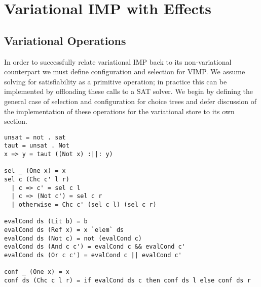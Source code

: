 \documentclass[letterpaper,10pt,onecolumn]{article}
\begin{document}
\section{Variational IMP with Effects}

\subsection{Variational Operations}

In order to successfully relate variational IMP back to its non-variational counterpart
we must define configuration and selection for VIMP. We assume solving for satisfiability
as a primitive operation; in practice this can be implemented by offloading these calls to
a SAT solver. We begin by defining the general case of selection and configuration for choice
trees and defer discussion of the implementation of these operations for the variational store to its own section.

\begin{lstlisting}
unsat = not . sat
taut = unsat . Not
x => y = taut ((Not x) :||: y)

sel _ (One x) = x
sel c (Chc c' l r)
  | c => c' = sel c l
  | c => (Not c') = sel c r
  | otherwise = Chc c' (sel c l) (sel c r)
  
evalCond ds (Lit b) = b
evalCond ds (Ref x) = x `elem` ds
evalCond ds (Not c) = not (evalCond c)
evalCond ds (And c c') = evalCond c && evalCond c'
evalCond ds (Or c c') = evalCond c || evalCond c'

conf _ (One x) = x
conf ds (Chc c l r) = if evalCond ds c then conf ds l else conf ds r
\end{lstlisting}
\end{document}
